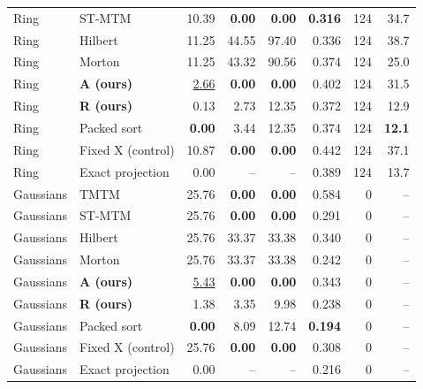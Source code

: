 \begin{longtable}{llrrrrrr}
Ring & ST-MTM & 10.39 & \textbf{0.00} & \textbf{0.00} & \textbf{0.316} & 124 & 34.7\\
Ring & Hilbert & 11.25 & 44.55 & 97.40 & 0.336 & 124 & 38.7\\
Ring & Morton & 11.25 & 43.32 & 90.56 & 0.374 & 124 & 25.0\\
Ring & \textbf{A (ours)} & \underline{2.66} & \textbf{0.00} & \textbf{0.00} & 0.402 & 124 & 31.5\\
Ring & \textbf{R (ours)} & 0.13 & 2.73 & 12.35 & 0.372 & 124 & 12.9\\
Ring & Packed sort & \textbf{0.00} & 3.44 & 12.35 & 0.374 & 124 & \textbf{12.1}\\
Ring & Fixed X (control) & 10.87 & \textbf{0.00} & \textbf{0.00} & 0.442 & 124 & 37.1\\
Ring & Exact projection & 0.00 & -- & -- & 0.389 & 124 & 13.7\\
Gaussians & TMTM & 25.76 & \textbf{0.00} & \textbf{0.00} & 0.584 & 0 & --\\
Gaussians & ST-MTM & 25.76 & \textbf{0.00} & \textbf{0.00} & 0.291 & 0 & --\\
Gaussians & Hilbert & 25.76 & 33.37 & 33.38 & 0.340 & 0 & --\\
Gaussians & Morton & 25.76 & 33.37 & 33.38 & 0.242 & 0 & --\\
Gaussians & \textbf{A (ours)} & \underline{5.43} & \textbf{0.00} & \textbf{0.00} & 0.343 & 0 & --\\
Gaussians & \textbf{R (ours)} & 1.38 & 3.35 & 9.98 & 0.238 & 0 & --\\
Gaussians & Packed sort & \textbf{0.00} & 8.09 & 12.74 & \textbf{0.194} & 0 & --\\
Gaussians & Fixed X (control) & 25.76 & \textbf{0.00} & \textbf{0.00} & 0.308 & 0 & --\\
Gaussians & Exact projection & 0.00 & -- & -- & 0.216 & 0 & --\\
\end{longtable}\endgroup

